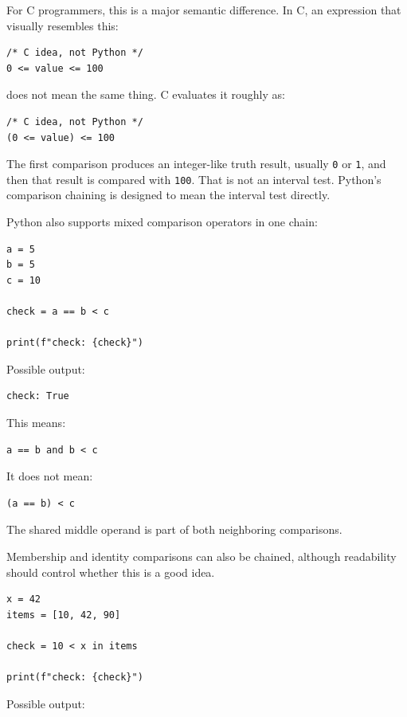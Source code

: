 For C programmers, this is a major semantic difference. In C, an expression that visually resembles this:

\begin{verbatim}
/* C idea, not Python */
0 <= value <= 100
\end{verbatim}

does not mean the same thing. C evaluates it roughly as:

\begin{verbatim}
/* C idea, not Python */
(0 <= value) <= 100
\end{verbatim}

The first comparison produces an integer-like truth result, usually \texttt{0} or \texttt{1}, and then that result is compared with \texttt{100}. That is not an interval test. Python's comparison chaining is designed to mean the interval test directly.

Python also supports mixed comparison operators in one chain:

\begin{verbatim}
a = 5
b = 5
c = 10

check = a == b < c

print(f"check: {check}")
\end{verbatim}

Possible output:

\begin{verbatim}
check: True
\end{verbatim}

This means:

\begin{verbatim}
a == b and b < c
\end{verbatim}

It does not mean:

\begin{verbatim}
(a == b) < c
\end{verbatim}

The shared middle operand is part of both neighboring comparisons.

Membership and identity comparisons can also be chained, although readability should control whether this is a good idea.

\begin{verbatim}
x = 42
items = [10, 42, 90]

check = 10 < x in items

print(f"check: {check}")
\end{verbatim}

Possible output:

